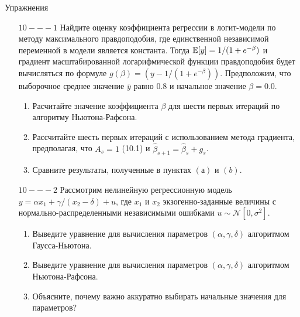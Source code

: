 \begin{center}
Упражнения
\end{center}

\begin{enumerate}
\item [$10 --- 1$] Найдите оценку коэффициента регрессии в логит-модели по методу максимального правдоподобия, где единственной независимой переменной в модели является константа. Тогда $\mathbb{E}[y]=1/(1+e^{-\beta})$ и градиент масштабированной логарифмической функции правдоподобия будет вычисляться по формуле $g(\beta)=(y-1/(1+e^{-\beta}))$. Предположим, что выборочное среднее значение $\bar{y}$ равно 0.8 и начальное значение $\beta=0.0$.
\begin{enumerate}
\item Расчитайте значение коэффициента $\beta$ для шести первых итераций по алгоритму Ньютона-Рафсона.
\item Рассчитайте шесть первых итераций с использованием метода градиента, предполагая, что $A_s=1$ (10.1) и $\hat{\beta}_{s+1}=\hat{\beta}_s+g_s$.
\item Сравните результаты, полученные в пунктах $(а)$ и $(b)$.
\end{enumerate}


\item [$10 --- 2$] Рассмотрим нелинейную регрессионную модель $y = \alpha{x_1}+\gamma/(x_2-\delta)+u$, где $x_1$ и $x_2$ экзогенно-заданные величины с нормально-распределенными независимыми ошибками $u \sim \mathcal{N}[0,\sigma^2]$.
\begin{enumerate}
\item Выведите уравнение для вычисления параметров $(\alpha, \gamma, \delta)$  алгоритмом Гаусса-Ньютона.
\item Выведите уравнение для вычисления параметров $(\alpha, \gamma, \delta)$ алгоритмом Ньютона-Рафсона.
\item Объясните, почему важно аккуратно выбирать начальные значения для параметров?
\end{enumerate}


\end{enumerate}
